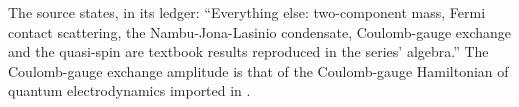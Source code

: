 The source states, in its ledger: ``Everything else: two-component mass, Fermi contact scattering, the Nambu-Jona-Lasinio condensate, Coulomb-gauge exchange and the quasi-spin are textbook results reproduced in the series' algebra.'' The Coulomb-gauge exchange amplitude is that of the Coulomb-gauge Hamiltonian of quantum electrodynamics imported in .
